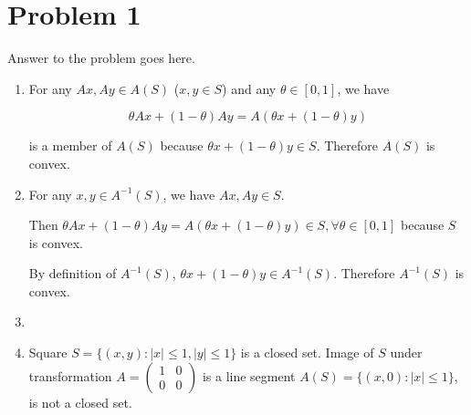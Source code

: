 \documentclass[12pt,letterpaper]{article}
\begin{document}
\section*{Problem 1}

Answer to the problem goes here.

\begin{enumerate}
    \item
        For any $Ax, Ay \in A(S)$ ($x, y \in S$) and any $\theta \in [0, 1]$, we have

        \[\theta Ax + (1 - \theta) Ay = A (\theta x + (1- \theta)y)\]

        is a member of $A(S)$ because $\theta x + (1-\theta) y \in S$.
        Therefore $A(S)$ is convex.

    \item
        For any $x, y \in A^{-1}(S)$, we have $Ax, Ay \in S$.

        Then $\theta Ax + (1-\theta)Ay = A(\theta x + (1-\theta)y) \in S,
        \forall \theta \in [0, 1]$ because $S$ is convex.

        By definition of $A^{-1}(S)$, $\theta x + (1-\theta)y \in A^{-1}(S)$. Therefore $A^{-1}(S)$ is convex.

    \item 

    \item Square $S = \{ (x, y) : |x| \le 1, |y| \le 1 \}$ is a closed set. Image
        of $S$ under transformation $A = (\begin{smallmatrix} 1 & 0 \\0 & 0
        \end{smallmatrix})$ is a line segment $A(S) = \{ (x, 0):
        |x| \le 1\}$, is not a closed set.

\end{enumerate}
\end{document}
